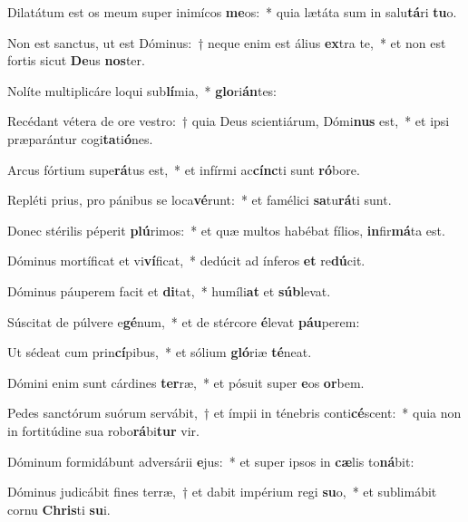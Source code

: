 \item Dilatátum est os meum super inimícos \textbf{me}os:~* quia lætáta sum in salu\textbf{tá}ri \textbf{tu}o.
\item Non est sanctus, ut est Dóminus:~† neque enim est álius \textbf{ex}tra te,~* et non est fortis sicut \textbf{De}us \textbf{nos}ter.
\item Nolíte multiplicáre loqui sub\textbf{lí}mia,~* \textbf{glo}ri\textbf{án}tes:
\item Recédant vétera de ore vestro:~† quia Deus scientiárum, Dómi\textbf{nus} est,~* et ipsi præparántur cogi\textbf{ta}ti\textbf{ó}nes.
\item Arcus fórtium supe\textbf{rá}tus est,~* et infírmi ac\textbf{cínc}ti sunt \textbf{ró}bore.
\item Repléti prius, pro pánibus se loca\textbf{vé}runt:~* et famélici \textbf{sa}tu\textbf{rá}ti sunt.
\item Donec stérilis péperit \textbf{plú}rimos:~* et quæ multos habébat fílios, \textbf{in}fir\textbf{má}ta est.
\item Dóminus mortíficat et vi\textbf{ví}ficat,~* dedúcit ad ínferos \textbf{et} re\textbf{dú}cit.
\item Dóminus páuperem facit et \textbf{di}tat,~* humíli\textbf{at} et \textbf{súb}levat.
\item Súscitat de púlvere e\textbf{gé}num,~* et de stércore \textbf{é}levat \textbf{páu}perem:
\item Ut sédeat cum prin\textbf{cí}pibus,~* et sólium \textbf{gló}riæ \textbf{té}neat.
\item Dómini enim sunt cárdines \textbf{ter}ræ,~* et pósuit super \textbf{e}os \textbf{or}bem.
\item Pedes sanctórum suórum servábit,~† et ímpii in ténebris conti\textbf{cé}scent:~* quia non in fortitúdine sua robo\textbf{rá}bi\textbf{tur} vir.
\item Dóminum formidábunt adversárii \textbf{e}jus:~* et super ipsos in \textbf{cæ}lis to\textbf{ná}bit:
\item Dóminus judicábit fines terræ,~† et dabit impérium regi \textbf{su}o,~* et sublimábit cornu \textbf{Chris}ti \textbf{su}i.
